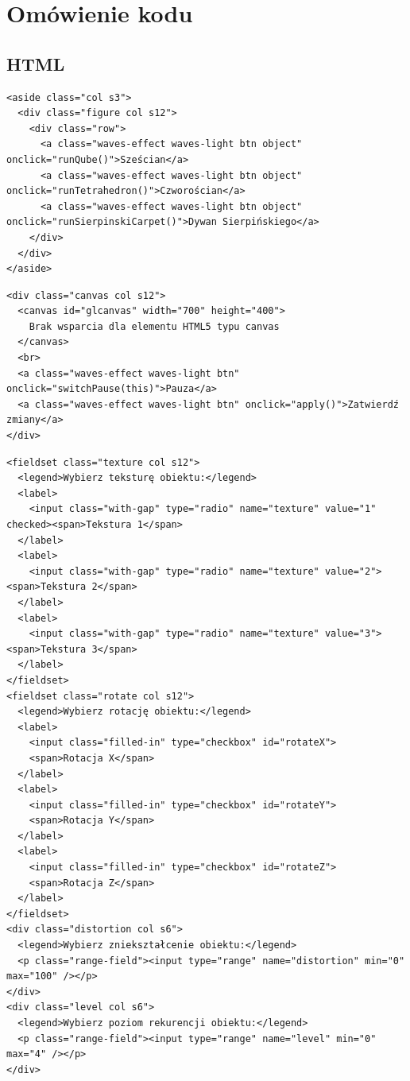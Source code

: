 \documentclass[12pt,a4paper,titlepage]{article}
\begin{document}
\section{Omówienie kodu}

\subsection{HTML}

\begin{listing}[H]
\caption{Struktura menu obiektów}
\begin{verbatim}
<aside class="col s3">
  <div class="figure col s12">
    <div class="row">
      <a class="waves-effect waves-light btn object" onclick="runQube()">Sześcian</a>
      <a class="waves-effect waves-light btn object" onclick="runTetrahedron()">Czworościan</a>
      <a class="waves-effect waves-light btn object" onclick="runSierpinskiCarpet()">Dywan Sierpińskiego</a>
    </div>
  </div>
</aside>
\end{verbatim}
\end{listing}

\begin{listing}[H]
\caption{Struktura kanwy}
\begin{verbatim}
<div class="canvas col s12">
  <canvas id="glcanvas" width="700" height="400">
    Brak wsparcia dla elementu HTML5 typu canvas
  </canvas>
  <br>
  <a class="waves-effect waves-light btn" onclick="switchPause(this)">Pauza</a>
  <a class="waves-effect waves-light btn" onclick="apply()">Zatwierdź zmiany</a>
</div>
\end{verbatim}
\end{listing}

\begin{listing}[H]
\caption{Struktura menu atrybutów}
\begin{verbatim}
<fieldset class="texture col s12">
  <legend>Wybierz teksturę obiektu:</legend>
  <label>
    <input class="with-gap" type="radio" name="texture" value="1" checked><span>Tekstura 1</span>
  </label>
  <label>
    <input class="with-gap" type="radio" name="texture" value="2"><span>Tekstura 2</span>
  </label>
  <label>
    <input class="with-gap" type="radio" name="texture" value="3"><span>Tekstura 3</span>
  </label>
</fieldset>
<fieldset class="rotate col s12">
  <legend>Wybierz rotację obiektu:</legend>
  <label>
    <input class="filled-in" type="checkbox" id="rotateX">
    <span>Rotacja X</span>
  </label>
  <label>
    <input class="filled-in" type="checkbox" id="rotateY">
    <span>Rotacja Y</span>
  </label>
  <label>
    <input class="filled-in" type="checkbox" id="rotateZ">
    <span>Rotacja Z</span>
  </label>
</fieldset>
<div class="distortion col s6">
  <legend>Wybierz zniekształcenie obiektu:</legend>
  <p class="range-field"><input type="range" name="distortion" min="0" max="100" /></p>
</div>
<div class="level col s6">
  <legend>Wybierz poziom rekurencji obiektu:</legend>
  <p class="range-field"><input type="range" name="level" min="0" max="4" /></p>
</div>
\end{verbatim}
\end{listing}
\end{document}

